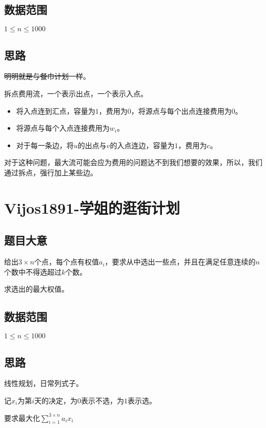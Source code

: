 \documentclass{ctexart}
\numberwithin{equation}{section}
\begin{document}
\begin{flushleft}
  \subsection{数据范围}
  $1\le n \le 1000$
  \subsection{思路}

  \sout{明明就是与餐巾计划一样}。

  拆点费用流，一个表示出点，一个表示入点。

  \begin{itemize}
  \item 将入点连到汇点，容量为$1$，费用为$0$，将源点与每个出点连接费用为$0$。
  \item 将源点与每个入点连接费用为$w_i$。
  \item 对于每一条边，将$u$的出点与$v$的入点连边，容量为$1$，费用为$c$。
  \end{itemize}

  对于这种问题，最大流可能会应为费用的问题达不到我们想要的效果，所以，我们通过拆点，强行加上某些边。
  
  \newpage

  \section{Vijos1891-学姐的逛街计划}
  \subsection{题目大意}
  给出$3\times n$个点，每个点有权值$a_i$，要求从中选出一些点，并且在满足任意连续的$n$个数中不得选超过$k$个数。

  求选出的最大权值。
  
    
  \subsection{数据范围}
  $1\le n \le 1000$
  \subsection{思路}

  线性规划，日常列式子。

  记$x_i$为第$i$天的决定，为$0$表示不选，为$1$表示选。

  要求最大化$\sum\limits_{i=1}^{3\times n}a_ix_i$


\end{flushleft}
\end{document}
